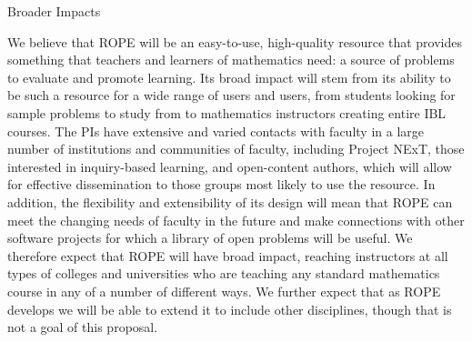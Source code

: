 \documentclass[11pt]{article}
\begin{document}


\begin{section}{Broader Impacts}

We believe that ROPE will be an easy-to-use, high-quality resource that
provides something that teachers and learners of mathematics need: a
source of problems to evaluate and promote learning.  Its broad impact
will stem from its ability to be such a resource for a wide range of users
and users, from students looking for sample problems to study from to
mathematics instructors creating entire IBL courses.  The PIs have
extensive and varied contacts with faculty 
in a large number of institutions and communities of faculty,
including Project NExT, those interested in inquiry-based learning, and
open-content authors, which will allow for effective dissemination to those 
groups most likely to use the resource.  
In addition, the flexibility and
extensibility of its design will mean that ROPE can meet the changing
needs of faculty in the future and make connections with other software
projects for which a library of open problems will be useful.  We
therefore expect that ROPE will have broad impact, reaching instructors at
all types of colleges and universities who are teaching any standard
mathematics course in any of a number of different ways.  We further
expect that as ROPE develops we will be able to extend it to include other
disciplines, though that is not a goal of this proposal.
\end{section}
\end{document}
